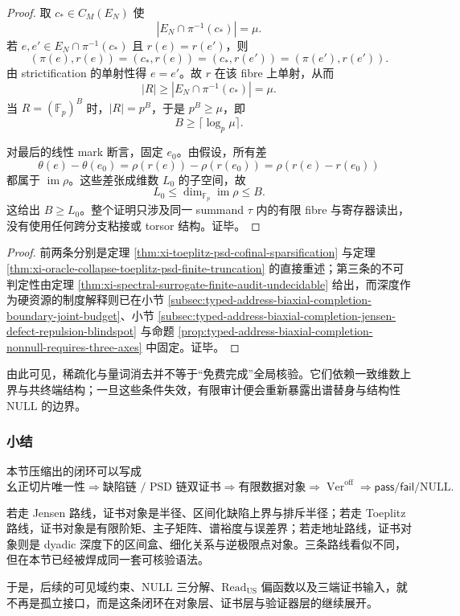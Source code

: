 \begin{proof}
取 \(c_\ast\in C_M(E_N)\) 使
\[
|E_N\cap\pi^{-1}(c_\ast)|=\mu.
\]
若 \(e,e'\in E_N\cap\pi^{-1}(c_\ast)\) 且 \(r(e)=r(e')\)，则
\[
(\pi(e),r(e))=(c_\ast,r(e))=(c_\ast,r(e'))=(\pi(e'),r(e')).
\]
由 strictification 的单射性得 \(e=e'\)。故 \(r\) 在该 fibre 上单射，从而
\[
|R|\ge |E_N\cap\pi^{-1}(c_\ast)|=\mu.
\]
当 \(R=(\mathbb F_p)^B\) 时，\(|R|=p^B\)，于是 \(p^B\ge\mu\)，即
\[
B\ge\lceil\log_p\mu\rceil.
\]

对最后的线性 mark 断言，固定 \(e_0\)。由假设，所有差
\[
\theta(e)-\theta(e_0)=\rho(r(e))-\rho(r(e_0))=\rho(r(e)-r(e_0))
\]
都属于 \(\operatorname{im}\rho\)。这些差张成维数 \(L_0\) 的子空间，故
\[
L_0\le \dim_{\mathbb F_p}\operatorname{im}\rho\le B.
\]
这给出 \(B\ge L_0\)。整个证明只涉及同一 summand \(\tau\) 内的有限 fibre 与寄存器读出，没有使用任何跨分支粘接或 torsor 结构。证毕。
\end{proof}

\begin{proof}
前两条分别是定理 \ref{thm:xi-toeplitz-psd-cofinal-sparsification} 与定理 \ref{thm:xi-oracle-collapse-toeplitz-psd-finite-truncation} 的直接重述；第三条的不可判定性由定理 \ref{thm:xi-spectral-surrogate-finite-audit-undecidable} 给出，而深度作为硬资源的制度解释则已在小节 \ref{subsec:typed-address-biaxial-completion-boundary-joint-budget}、小节 \ref{subsec:typed-address-biaxial-completion-jensen-defect-repulsion-blindspot} 与命题 \ref{prop:typed-address-biaxial-completion-nonnull-requires-three-axes} 中固定。证毕。
\end{proof}

由此可见，稀疏化与量词消去并不等于“免费完成”全局核验。它们依赖一致维数上界与共终端结构；一旦这些条件失效，有限审计便会重新暴露出谱替身与结构性 \(\mathrm{NULL}\) 的边界。

\subsubsection{小结}\label{subsubsec:typed-address-biaxial-completion-certificate-loop-summary}
本节压缩出的闭环可以写成
\[
\text{幺正切片唯一性}
\Longrightarrow
\text{缺陷链 / PSD 链双证书}
\Longrightarrow
\text{有限数据对象}
\Longrightarrow
\operatorname{Ver}^{\mathrm{off}}
\Longrightarrow
\mathsf{pass}/\mathsf{fail}/\mathrm{NULL}.
\]

若走 Jensen 路线，证书对象是半径、区间化缺陷上界与排斥半径；若走 Toeplitz 路线，证书对象是有限阶矩、主子矩阵、谱裕度与误差界；若走地址路线，证书对象则是 dyadic 深度下的区间盒、细化关系与逆极限点对象。三条路线看似不同，但在本节已经被焊成同一套可核验语法。

于是，后续的可见域约束、\(\mathrm{NULL}\) 三分解、\(\mathrm{Read}_{\mathrm{US}}\) 偏函数以及三端证书输入，就不再是孤立接口，而是这条闭环在对象层、证书层与验证器层的继续展开。
